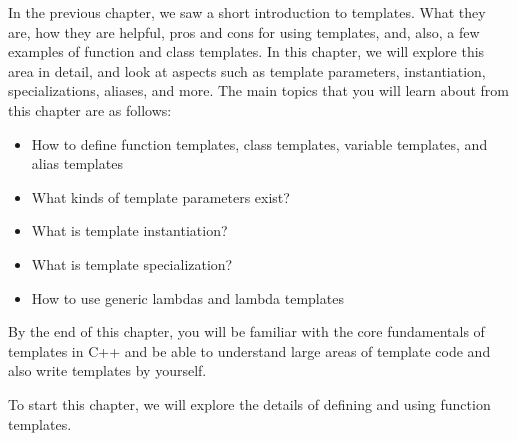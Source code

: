 In the previous chapter, we saw a short introduction to templates. What they are, how they are helpful, pros and cons for using templates, and, also, a few examples of function and class templates. In this chapter, we will explore this area in detail, and look at aspects such as template parameters, instantiation, specializations, aliases, and more. The main topics that you will learn about from this chapter are as follows:

\begin{itemize}
\item
How to define function templates, class templates, variable templates, and alias templates

\item
What kinds of template parameters exist?

\item
What is template instantiation?

\item
What is template specialization?

\item
How to use generic lambdas and lambda templates
\end{itemize}

By the end of this chapter, you will be familiar with the core fundamentals of templates in C++ and be able to understand large areas of template code and also write templates by yourself.

To start this chapter, we will explore the details of defining and using function templates.












